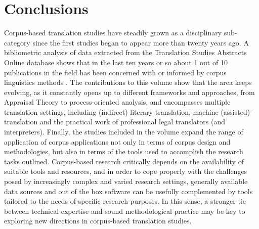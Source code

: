 \documentclass[output=paper]{LSP/langsci}
\begin{document}
\section{Conclusions}
Corpus-based translation studies have steadily grown as a disciplinary sub-category since the first studies began to appear more than twenty years ago. A bibliometric analysis of data extracted from the Translation Studies Abstracts Online database shows that in the last ten years or so about 1 out of 10 publications in the field has been concerned with or informed by corpus linguistics methods \citep{Zanettin2015}. The contributions to this volume show that the area keeps evolving, as it constantly opens up to different frameworks and approaches, from Appraisal Theory to process-oriented analysis, and encompasses multiple translation settings, including (indirect) literary translation, machine (assisted)-translation and the practical work of professional legal translators (and interpreters). Finally, the studies included in the volume expand the range of application of corpus applications not only in terms of corpus design and methodologies, but also in terms of the tools used to accomplish the research tasks outlined. Corpus-based research critically depends on the availability of suitable tools and resources, and in order to cope properly with the challenges posed by increasingly complex and varied research settings, generally available data sources and out of the box software can be usefully complemented by tools tailored to the needs of specific research purposes. In this sense, a stronger tie between technical expertise and sound methodological practice may be key to exploring new directions in corpus-based translation studies.

\printbibliography[heading=subbibliography,notkeyword=this]
\end{document}
